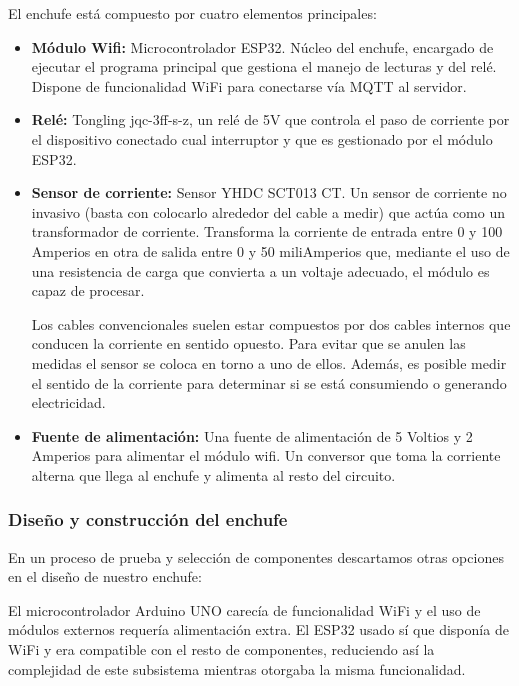 \documentclass[a4paper,10pt]{article}
\begin{document}
El enchufe está compuesto por cuatro elementos principales:

\begin{itemize}
\item{\textbf{Módulo Wifi:} Microcontrolador
  ESP32\cite{ESP32SeriesDatasheet}. Núcleo del enchufe, encargado de
  ejecutar el programa principal que gestiona el manejo de lecturas y
  del relé. Dispone de funcionalidad WiFi para conectarse vía MQTT al
  servidor.}

\item{\textbf{Relé:} Tongling jqc-3ff-s-z, un relé de 5V que controla
  el paso de corriente por el dispositivo conectado cual interruptor y
  que es gestionado por el módulo ESP32.}

\item{\textbf{Sensor de corriente:} Sensor YHDC SCT013
  CT\cite{SCT013000DatasheetPDF}. Un sensor de corriente no invasivo
  (basta con colocarlo alrededor del cable a medir) que actúa como un
  transformador de corriente. Transforma la corriente de entrada entre
  0 y 100 Amperios en otra de salida entre 0 y 50 miliAmperios que,
  mediante el uso de una resistencia de carga que convierta a un
  voltaje adecuado, el módulo es capaz de procesar.

  Los cables convencionales suelen estar compuestos por dos cables
  internos que conducen la corriente en sentido opuesto. Para evitar
  que se anulen las medidas el sensor se coloca en torno a uno de
  ellos. Además, es posible medir el sentido de la corriente para
  determinar si se está consumiendo o generando electricidad.}

\item{\textbf{Fuente de alimentación:} Una fuente de alimentación de
  5 Voltios y 2 Amperios para alimentar el módulo wifi. Un conversor
  que toma la corriente alterna que llega al enchufe y alimenta al
  resto del circuito.}
\end{itemize}

\subsubsection{Diseño y construcción del enchufe}

En un proceso de prueba y selección de componentes descartamos otras
opciones en el diseño de nuestro enchufe:

El microcontrolador Arduino UNO carecía de funcionalidad WiFi y el uso de módulos
externos requería alimentación extra. El ESP32 usado sí que disponía
de WiFi y era compatible con el resto de componentes, reduciendo así
la complejidad de este subsistema mientras otorgaba la misma funcionalidad.
\end{document}
